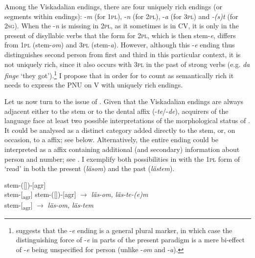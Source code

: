\documentclass[output=paper,colorlinks,citecolor=brown,draft,draftmode]{langscibook}
\begin{document}
Among the Viskadalian endings, there are four uniquely rich endings (or segments within endings): -\textit{m} (for 1\textsc{pl}), -\textit{n} (for 2\textsc{pl}), -\textit{a} (for 3\textsc{pl}) and \textit{-(s)t} (for 2\textsc{sg}). When the -\textit{n} is missing in 2\textsc{pl}, as it sometimes is in CV, it is only in the present  of disyllabic verbs that the form for 2\textsc{pl}, which is then stem-\textit{e}, differs from 1\textsc{pl} (stem-\textit{om}) and 3\textsc{pl} (stem-\textit{a}). However, although this -\textit{e} ending thus distinguishes second person from first and third in this particular context, it is not uniquely rich, since it also occurs with 3\textsc{pl} in the past  of strong verbs (e.g. \textit{da finge} ‘they got’).\footnote{\citet{Petzell2017} suggests that the -\textit{e} ending is a general plural marker, in which case the distinguishing force of \nobreakdash-\textit{e} in parts of the present  paradigm is a mere bi-effect of -\textit{e} being unspecified for person (unlike -\textit{om} and -\textit{a}).} I propose that in order for  to count as semantically rich it needs to express the PNU on V with uniquely rich endings.



Let us now turn to the issue of . Given that the Viskadalian  endings are always adjacent either to the stem or to the dental  affix (-\textit{te}/-\textit{de}), acquirers of the language face at least two possible interpretations of the morphological status of . It could be analysed as a distinct category added directly to the stem, or, on occasion, to a  affix; see  below. Alternatively, the entire ending could be interpreted as a  affix containing additional (and secondary) information about person and number; see . I exemplify both possibilities in  with the 1\textsc{pl} form of ‘read’ in both the present (\textit{läsom}) and the past  (\textit{lästem}).


\ea\label{ex:petzell:26}
\ea\label{ex:petzell:26a}  stem-([])-[agr]\\
\ex\label{ex:petzell:26b}  stem-[\textsubscript{agr}]
\z
\ex\label{ex:petzell:27}
\ea\label{ex:petzell:27a}  stem-([])-[agr]  $\to$ \textit{läs-om,} \textit{läs-te-(e)m}\\
\ex\label{ex:petzell:27b}  stem-[\textsubscript{agr}]      $\to$ \textit{läs-om, läs-tem}
\z
\z
\end{document}
